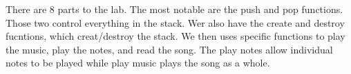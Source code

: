 There are 8 parts to the lab. The most notable are the push and pop functions. Those two control everything in the stack. Wer also have the create and destroy fucntions, which creat/destroy the stack. We then uses specific functions to play the music, play the notes, and read the song. The play notes allow individual notes to be played while play music plays the song as a whole. 